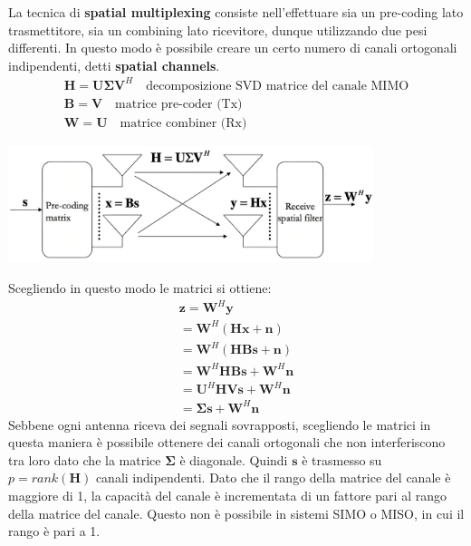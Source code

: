 La tecnica di \textbf{spatial multiplexing} consiste nell'effettuare sia un pre-coding lato trasmettitore, sia un combining lato ricevitore, dunque utilizzando due pesi differenti. In questo modo è possibile creare un certo numero di canali ortogonali indipendenti, detti \textbf{spatial channels}.
\[
    \begin{array}{ll}
        \mathbf{H} = \mathbf{U} \mathbf{\Sigma} \mathbf{V}^H \quad \text{decomposizione SVD matrice del canale MIMO} \\
        \mathbf{B} = \mathbf{V} \quad \text{matrice pre-coder (Tx)} \\
        \mathbf{W} = \mathbf{U} \quad \text{matrice combiner (Rx)}
    \end{array}
\]
\begin{center}
    \includegraphics[width=0.8\textwidth]{imgs/mimo.jpg}
\end{center}

Scegliendo in questo modo le matrici si ottiene:
\[
    \begin{array}{ll}
        \mathbf{z} = \mathbf{W}^H \mathbf{y}  \\
        = \mathbf{W}^H \left( \mathbf{H} \mathbf{x} + \mathbf{n}  \right) \\  
        = \mathbf{W}^H \left( \mathbf{H} \mathbf{B} \mathbf{s} + \mathbf{n} \right) \\
        = \mathbf{W}^H \mathbf{H} \mathbf{B} \mathbf{s} + \mathbf{W}^H \mathbf{n}  \\
        = \mathbf{U}^H \mathbf{H} \mathbf{V} \mathbf{s} + \mathbf{W}^H \mathbf{n} \\
        = \mathbf{\Sigma} \mathbf{s} + \mathbf{W}^H \mathbf{n}
    \end{array}
\]
Sebbene ogni antenna riceva dei segnali sovrapposti, scegliendo le matrici in questa maniera è possibile ottenere dei canali ortogonali che non interferiscono tra loro dato che la matrice $\mathbf{\Sigma}$ è diagonale.
Quindi $\mathbf{s}$ è trasmesso su $p = rank(\mathbf{H})$ canali indipendenti.
Dato che il rango della matrice del canale è maggiore di 1, la capacità del canale è incrementata di un fattore pari al rango della matrice del canale. Questo non è possibile in sistemi SIMO o MISO, in cui il rango è pari a 1.

